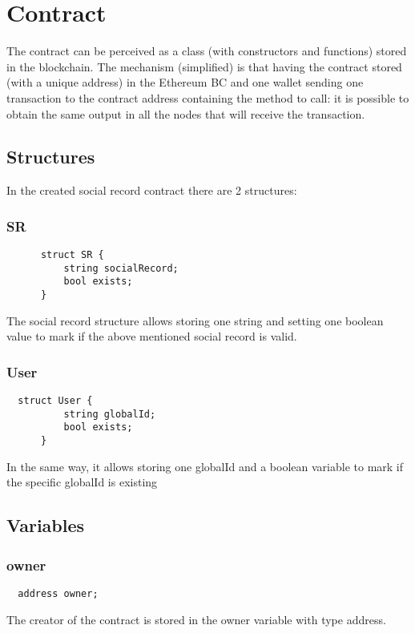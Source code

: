 \section{Contract}
The contract can be perceived as a class (with constructors and functions) stored in the blockchain.
The mechanism (simplified) is that having the contract stored (with a unique address) in the Ethereum BC and one wallet sending one transaction to the contract address containing the method to call: it is possible to obtain the same output in all the nodes that will receive the transaction.

\subsection{Structures}
In the created social record contract there are 2 structures:

\subsubsection{SR}
\begin{lstlisting}
      struct SR {
          string socialRecord;
          bool exists;
      }
\end{lstlisting}
The social record structure allows storing one string and setting one boolean value to mark if the above mentioned social record is valid.

\subsubsection{User}
\begin{lstlisting}
  struct User {
          string globalId;
          bool exists;
      }
\end{lstlisting}
In the same way, it allows storing one globalId and a boolean variable to mark if the specific globalId is existing

\subsection{Variables}
\subsubsection{owner}
\begin{lstlisting}
  address owner;
\end{lstlisting}
The creator of the contract is stored in the owner variable with type address.

